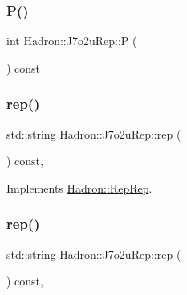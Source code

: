 \mbox{\label{structHadron_1_1J7o2uRep_a88b8aa1e3c89050f1f0a901f0082b927}} 
\subsubsection{\texorpdfstring{P()}{P()}\hspace{0.1cm}{\footnotesize\ttfamily [2/2]}}
{\footnotesize\ttfamily int Hadron\+::\+J7o2u\+Rep\+::P (\begin{DoxyParamCaption}{ }\end{DoxyParamCaption}) const\hspace{0.3cm}{\ttfamily [inline]}}

\mbox{\label{structHadron_1_1J7o2uRep_a49421513b527a11bd45ec02e4ad3a042}} 
\subsubsection{\texorpdfstring{rep()}{rep()}\hspace{0.1cm}{\footnotesize\ttfamily [1/2]}}
{\footnotesize\ttfamily std\+::string Hadron\+::\+J7o2u\+Rep\+::rep (\begin{DoxyParamCaption}{ }\end{DoxyParamCaption}) const\hspace{0.3cm}{\ttfamily [inline]}, {\ttfamily [virtual]}}



Implements \mbox{\hyperlink{structHadron_1_1RepRep_ab3213025f6de249f7095892109575fde}{Hadron\+::\+Rep\+Rep}}.

\mbox{\label{structHadron_1_1J7o2uRep_a49421513b527a11bd45ec02e4ad3a042}} 
\subsubsection{\texorpdfstring{rep()}{rep()}\hspace{0.1cm}{\footnotesize\ttfamily [2/2]}}
{\footnotesize\ttfamily std\+::string Hadron\+::\+J7o2u\+Rep\+::rep (\begin{DoxyParamCaption}{ }\end{DoxyParamCaption}) const\hspace{0.3cm}{\ttfamily [inline]}, {\ttfamily [virtual]}}



